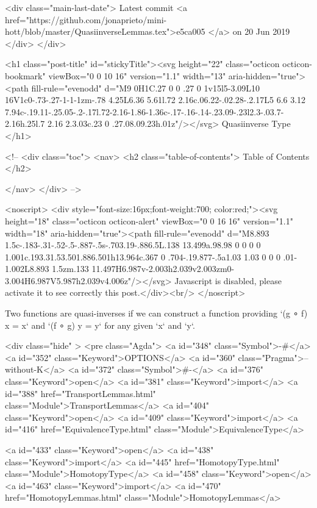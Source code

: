     <div class="main-last-date">
      Latest commit <a href="https://github.com/jonaprieto/mini-hott/blob/master/QuasiinverseLemmas.tex">e5ca005 </a> on  20 Jun 2019
    </div>
  </div>
  
  <h1 class="post-title" id="stickyTitle"><svg height="22" class="octicon octicon-bookmark" viewBox="0 0 10 16" version="1.1" width="13" aria-hidden="true"><path fill-rule="evenodd" d="M9 0H1C.27 0 0 .27 0 1v15l5-3.09L10 16V1c0-.73-.27-1-1-1zm-.78 4.25L6.36 5.61l.72 2.16c.06.22-.02.28-.2.17L5 6.6 3.12 7.94c-.19.11-.25.05-.2-.17l.72-2.16-1.86-1.36c-.17-.16-.14-.23.09-.23l2.3-.03.7-2.16h.25l.7 2.16 2.3.03c.23 0 .27.08.09.23h.01z"/></svg> Quasiinverse Type
  </h1>

  <!-- 
  <div class="toc">
    <nav>
    <h2 class="table-of-contents"> Table of Contents </h2>
      

    </nav>
  </div>
   -->

  <noscript>
  <div style="font-size:16px;font-weight:700; color:red;"><svg height="18" class="octicon octicon-alert" viewBox="0 0 16 16" version="1.1" width="18" aria-hidden="true"><path fill-rule="evenodd" d="M8.893 1.5c-.183-.31-.52-.5-.887-.5s-.703.19-.886.5L.138 13.499a.98.98 0 0 0 0 1.001c.193.31.53.501.886.501h13.964c.367 0 .704-.19.877-.5a1.03 1.03 0 0 0 .01-1.002L8.893 1.5zm.133 11.497H6.987v-2.003h2.039v2.003zm0-3.004H6.987V5.987h2.039v4.006z"/></svg> Javascript is disabled, please activate it to see correctly this post.</div><br/>
  </noscript>

  Two functions are quasi-inverses if we can construct a function providing
`(g ∘ f) x = x` and `(f ∘ g) y = y` for any given `x` and `y`.

<div class="hide" >
<pre class="Agda">
<a id="348" class="Symbol">{-#</a> <a id="352" class="Keyword">OPTIONS</a> <a id="360" class="Pragma">--without-K</a> <a id="372" class="Symbol">#-}</a>
<a id="376" class="Keyword">open</a> <a id="381" class="Keyword">import</a> <a id="388" href="TransportLemmas.html" class="Module">TransportLemmas</a>
<a id="404" class="Keyword">open</a> <a id="409" class="Keyword">import</a> <a id="416" href="EquivalenceType.html" class="Module">EquivalenceType</a>

<a id="433" class="Keyword">open</a> <a id="438" class="Keyword">import</a> <a id="445" href="HomotopyType.html" class="Module">HomotopyType</a>
<a id="458" class="Keyword">open</a> <a id="463" class="Keyword">import</a> <a id="470" href="HomotopyLemmas.html" class="Module">HomotopyLemmas</a>


